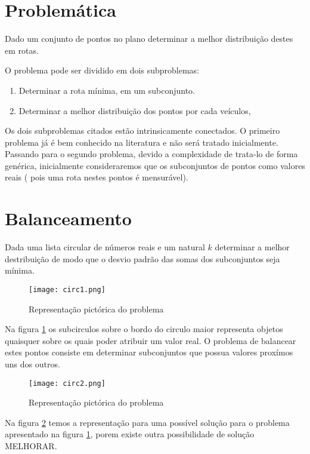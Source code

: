 \section{Problemática}


	Dado um conjunto de pontos no plano determinar a melhor distribuição destes
em rotas.

	O problema pode ser dividido em dois subproblemas:
\begin{enumerate}
\item Determinar a rota mínima, em um subconjunto.
\item Determinar a melhor distribuição dos pontos por cada veículos,
\end{enumerate}

	Os dois subproblemas citados estão intrinsicamente conectados. O primeiro
problema já é bem conhecido na literatura e não será tratado inicialmente.
Passando para o segundo problema, devido a complexidade de trata-lo de forma
genérica, inicialmente consideraremos que os subconjuntos de pontos como valores
reais ( pois uma rota nestes pontos é mensurável). 


\section{Balanceamento}

	Dada uma lista circular de números reais e um natural $k$ determinar a
melhor destribuição de modo que o desvio padrão das somas dos subconjuntos seja
mínima.

\begin{figure}[!ht]
\centering
\texttt{[image: circ1.png]}
\caption{Representação pictórica do problema}
\label{circ1}
\end{figure}

	Na figura \ref{circ1} os subcirculos sobre o bordo do circulo maior
representa objetos quaisquer sobre os quais poder atribuir um valor real. O
problema de balancear estes pontos consiste em determinar subconjuntos que
possua valores proxímos uns dos outros. 

\begin{figure}[!ht]
\centering
\texttt{[image: circ2.png]}
\caption{Representação pictórica do problema}
\label{circ2}
\end{figure}

	Na figura \ref{circ2} temos a representação para uma possível solução para o
problema apresentado na figura \ref{circ1}, porem existe outra possibilidade de
solução {\color{red} MELHORAR}.


